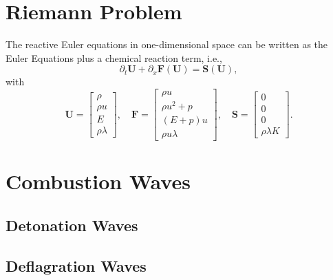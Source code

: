 \section{Riemann Problem}
The reactive Euler equations in one-dimensional space can be written as the Euler Equations plus a chemical reaction term, i.e.,
\begin{equation}
\partial_t \mathbf{U} + \partial_x \mathbf{F}(\mathbf{U}) = \mathbf{S}(\mathbf{U}),
\end{equation}
with
\begin{equation}
\boldsymbol{U} = \begin{bmatrix} \rho \\ \rho u \\ E \\ \rho \lambda \end{bmatrix}, \quad
\boldsymbol{F} = \begin{bmatrix} \rho u \\ \rho u^2 + p \\  (E+p)u \\ \rho u \lambda  \end{bmatrix}, \quad
\boldsymbol{S} = \begin{bmatrix} 0 \\ 0 \\ 0 \\ \rho \lambda K\end{bmatrix}.
\end{equation}
\section{Combustion Waves}
\subsection{Detonation Waves}
\subsection{Deflagration Waves}

